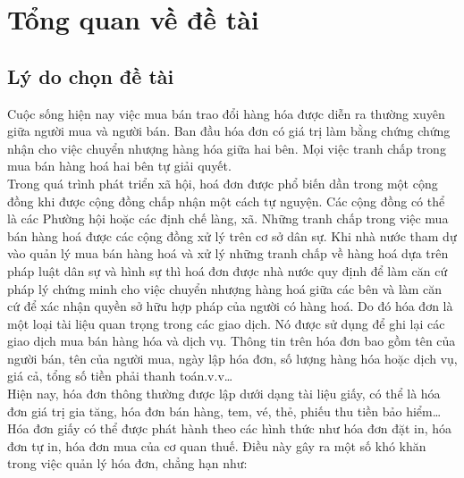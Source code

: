 \chapter{Tổng quan về đề tài} \label{chapter1}

\section{Lý do chọn đề tài}
Cuộc sống hiện nay việc mua bán trao đổi hàng hóa được diễn ra thường xuyên giữa người mua và người bán. Ban đầu hóa đơn có giá trị làm bằng chứng chứng nhận cho việc chuyển nhượng hàng hóa giữa hai bên. Mọi việc tranh chấp trong mua bán hàng hoá hai bên tự giải quyết. \\
\indent Trong quá trình phát triển xã hội, hoá đơn được phổ biến dần trong một cộng đồng khi được cộng đồng chấp nhận một cách tự nguyện. Các cộng đồng có thể là các Phường hội hoặc các định chế làng, xã. Những tranh chấp trong việc mua bán hàng hoá được các cộng đồng xử lý trên cơ sở dân sự. Khi nhà nước tham dự vào quản lý mua bán hàng hoá và xử lý những tranh chấp về hàng hoá dựa trên pháp luật dân sự và hình sự thì hoá đơn được nhà nước quy định để làm căn cứ pháp lý chứng minh cho việc chuyển nhượng hàng hoá giữa các bên và làm căn cứ để xác nhận quyền sở hữu hợp pháp của người có hàng hoá. Do đó hóa đơn là một loại tài liệu quan trọng trong các giao dịch. Nó được sử dụng để ghi lại các giao dịch mua bán hàng hóa và dịch vụ. Thông tin trên hóa đơn bao gồm tên của người bán, tên của người mua, ngày lập hóa đơn, số lượng hàng hóa hoặc dịch vụ, giá cả, tổng số tiền phải thanh toán.v.v\dots \\
\indent Hiện nay, hóa đơn thông thường được lập dưới dạng tài liệu giấy, có thể là hóa đơn giá trị gia tăng, hóa đơn bán hàng, tem, vé, thẻ, phiếu thu tiền bảo hiểm\dots Hóa đơn giấy có thể được phát hành theo các hình thức như hóa đơn đặt in, hóa đơn tự in, hóa đơn mua của cơ quan thuế. Điều này gây ra một số khó khăn trong việc quản lý hóa đơn, chẳng hạn như:
